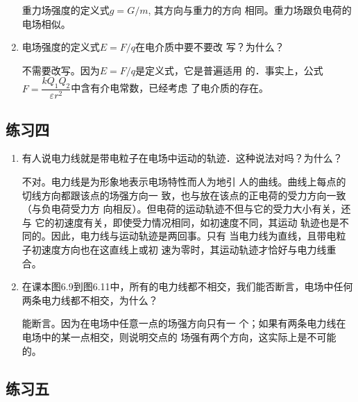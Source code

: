 \begin{enumerate}
\begin{solution}
    重力场强度的定义式$g=G/m$, 其方向与重力的方向
    相同。重力场跟负电荷的电场相似。
\end{solution}

\item 电场强度的定义式$E=F/q$在电介质中要不要改
写？为什么？

\begin{solution}
    不需要改写。因为$E=F/q$是定义式，它是普遍适用
    的．事实上，公式$F=\dfrac{kQ_1Q_2}{\varepsilon r^2}$中含有介电常数，已经考虑
    了电介质的存在。
\end{solution}

\end{enumerate}


\subsection{练习四}

\begin{enumerate}
	\item 有人说电力线就是带电粒子在电场中运动的轨迹．这种说法对吗？为什么？

    \begin{solution}
不对。电力线是为形象地表示电场特性而人为地引
人的曲线。曲线上每点的切线方向都跟该点的场强方向一
致，也与放在该点的正电荷的受力方向一致（与负电荷受力方
向相反）。但电荷的运动轨迹不但与它的受力大小有关，还与
它的初速度有关，即使受力情况相同，如初速度不同，其运动
轨迹也是不同的。因此，电力线与运动轨迹是两回事。只有
当电力线为直线，且带电粒子初速度方向也在这直线上或初
速为零时，其运动轨迹才恰好与电力线重合。
    \end{solution}
    
	\item 在课本图6.9到图6.11中，所有的电力线都不相交，我们能否断言，电场中任何两条电力线都不相交，为什么？

    \begin{solution}
        能断言。因为在电场中任意一点的场强方向只有一
        个；如果有两条电力线在电场中的某一点相交，则说明交点的
        场强有两个方向，这实际上是不可能的。
    \end{solution}
    
\end{enumerate}


\subsection{练习五}

